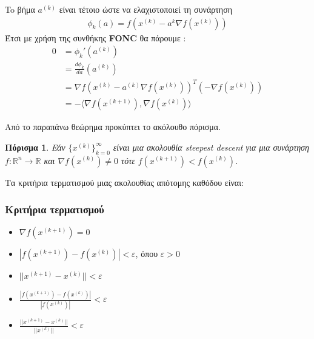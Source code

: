 \documentclass[a4paper,12pt,twoside]{report}
\theoremstyle{plain}
\newtheorem{cor}{Πόρισμα}[section]
\theoremstyle{definition}
\theoremstyle{remark}
\begin{document}
To βήμα $a^{(k)}$ είναι τέτοιο ώστε να ελαχιστοποιεί τη συνάρτηση
\begin{align*}
\phi_k(a) = f(x^{(k)} - a^k\nabla f(x^{(k)}))
\end{align*}
Έτσι με χρήση της συνθήκης \textbf{FONC} θα πάρουμε :
\begin{equation}
\begin{split}
0 &= \phi _k '(a^{(k)}) \\
&= \frac{d\phi _k}{da}(a^{(k)}) \\
&= \nabla f(x^{(k)} - a^{(k)}\nabla f(x^{(k)}))^T(-\nabla f(x^{(k)})) \\
&= - \langle\nabla f(x^{(k+1)}),\nabla f(x^{(k)})\rangle
\end{split}
\end{equation}

Από το παραπάνω θεώρημα προκύπτει το ακόλουθο πόρισμα. 

\begin{cor}
Εάν $\{ x^{(k)}\}_{k=0}^{\infty}$ είναι μια  ακολουθία steepest descent για μια συνάρτηση \\$f:\mathbb{R} ^n \rightarrow \mathbb{R}$ και $\nabla f(x^{(k)}) \neq 0$ τότε $f(x^{(k+1)})<f(x^{(k)})$.
\end{cor}

Τα κριτήρια τερματισμού μιας ακολουθίας απότομης καθόδου είναι:

\subsubsection{Κριτήρια τερματισμού}
\begin{itemize}
\item $\nabla f(x^{(k+1)}) = 0$
\vspace{-0.2cm}
\item $|f(x^{(k+1)}) - f(x^{(k)})| < \varepsilon$, όπου $\varepsilon >0$
\vspace{-0.2cm}
\item $||x^{(k+1)} - x^{(k)}||<\varepsilon$
\vspace{-0.2cm}
\item $\frac{|f(x^{(k+1)}) - f(x^{(k)})|}{|f(x^{(k)})|}<\varepsilon$
\vspace{-0.2cm}
\item $\frac{||x^{(k+1)} - x^{(k)}||}{||x^{(k)}||} < \varepsilon$
\end{itemize}

\end{document}
